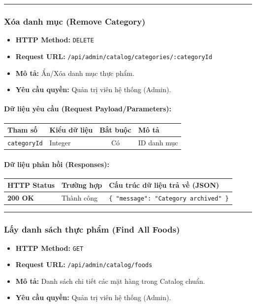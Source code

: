 \documentclass[12pt,a4paper]{article}
\begin{document}
\vskip 0.4cm
\noindent\rule{\textwidth}{0.3pt}
\vskip 0.4cm

\subsubsection{Xóa danh mục (Remove Category)}
\begin{itemize}[leftmargin=*]
    \item \textbf{HTTP Method:} \texttt{DELETE}
    \item \textbf{Request URL:} \texttt{/api/admin/catalog/categories/:categoryId}
    \item \textbf{Mô tả:} Ẩn/Xóa danh mục thực phẩm.
    \item \textbf{Yêu cầu quyền:} Quản trị viên hệ thống (Admin).
\end{itemize}

\paragraph{Dữ liệu yêu cầu (Request Payload/Parameters):}
\begin{longtable}{|>{\raggedright\arraybackslash}p{2.8cm}|>{\raggedright\arraybackslash}p{2.2cm}|c|>{\raggedright\arraybackslash}p{7.0cm}|}
\hline
\textbf{Tham số} & \textbf{Kiểu dữ liệu} & \textbf{Bắt buộc} & \textbf{Mô tả} \\ \hline
\endhead
\texttt{categoryId} & Integer & Có & ID danh mục \\ \hline
\end{longtable}

\paragraph{Dữ liệu phản hồi (Responses):}
\begin{longtable}{|>{\raggedright\arraybackslash}p{2.8cm}|>{\raggedright\arraybackslash}p{3.2cm}|>{\raggedright\arraybackslash}p{8.0cm}|}
\hline
\textbf{HTTP Status} & \textbf{Trường hợp} & \textbf{Cấu trúc dữ liệu trả về (JSON)} \\ \hline
\endhead
\textbf{200 OK} & Thành công & \texttt{\{ "message": "Category archived" \}} \\ \hline
\end{longtable}

\vskip 0.4cm
\noindent\rule{\textwidth}{0.3pt}
\vskip 0.4cm

\subsubsection{Lấy danh sách thực phẩm (Find All Foods)}
\begin{itemize}[leftmargin=*]
    \item \textbf{HTTP Method:} \texttt{GET}
    \item \textbf{Request URL:} \texttt{/api/admin/catalog/foods}
    \item \textbf{Mô tả:} Danh sách chi tiết các mặt hàng trong Catalog chuẩn.
    \item \textbf{Yêu cầu quyền:} Quản trị viên hệ thống (Admin).
\end{itemize}
\end{document}
